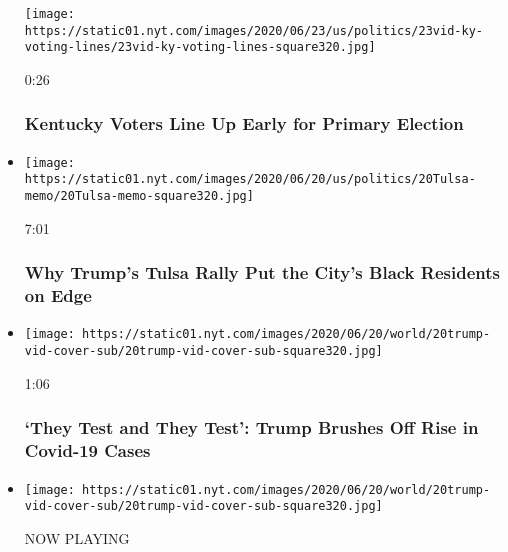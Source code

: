 \begin{itemize}
  \texttt{[image: https://static01.nyt.com/images/2020/06/23/us/politics/23vid-ky-voting-lines/23vid-ky-voting-lines-square320.jpg]}

  0:26

  \hypertarget{kentucky-voters-line-up-early-for-primary-election}{%
  \subsubsection{Kentucky Voters Line Up Early for Primary
  Election}\label{kentucky-voters-line-up-early-for-primary-election}}
\item
  \href{https://www.nytimes.com/video/us/100000007188759/trump-rally-juneteenth-tulsa-oklahoma.html?action=click\&module=video-series-bar\&region=header\&pgtype=Article\&playlistId=video/2020-Elections}{}

  \texttt{[image: https://static01.nyt.com/images/2020/06/20/us/politics/20Tulsa-memo/20Tulsa-memo-square320.jpg]}

  7:01

  \hypertarget{why-trumps-tulsa-rally-put-the-citys-black-residents-on-edge}{%
  \subsubsection{Why Trump's Tulsa Rally Put the City's Black Residents
  on
  Edge}\label{why-trumps-tulsa-rally-put-the-citys-black-residents-on-edge}}
\item
  \href{https://www.nytimes.com/video/us/politics/100000007202285/trump-tulsa-rally-coronavirus.html?action=click\&module=video-series-bar\&region=header\&pgtype=Article\&playlistId=video/2020-Elections}{}

  \texttt{[image: https://static01.nyt.com/images/2020/06/20/world/20trump-vid-cover-sub/20trump-vid-cover-sub-square320.jpg]}

  1:06

  \hypertarget{they-test-and-they-test-trump-brushes-off-rise-in-covid-19-cases}{%
  \subsubsection{`They Test and They Test': Trump Brushes Off Rise in
  Covid-19
  Cases}\label{they-test-and-they-test-trump-brushes-off-rise-in-covid-19-cases}}
\item
  \texttt{[image: https://static01.nyt.com/images/2020/06/20/world/20trump-vid-cover-sub/20trump-vid-cover-sub-square320.jpg]}

  NOW PLAYING


\end{itemize}
